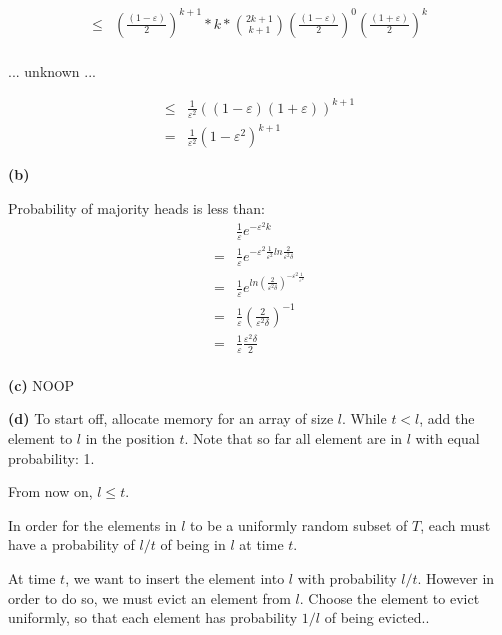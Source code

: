 \documentclass[11pt]{article}
\renewcommand{\part}[1] {\vspace{.10in} {\bf (#1)}}
\begin{document}
\begin{align*}
\leq & (\frac{(1-\varepsilon)}{2})^{k+1} * k * \binom{2k+1}{k+1} (\frac{(1-\varepsilon)}{2})^{0} (\frac{(1+\varepsilon)}{2})^{k}\\
\end{align*}

... unknown ...

\begin{align*}
\leq & \frac{1}{\varepsilon^2} ((1-\varepsilon)(1+\varepsilon))^{k+1}\\
= & \frac{1}{\varepsilon^2} (1-\varepsilon^2)^{k+1}
\end{align*}

\part{b}

Probability of majority heads is less than:
\begin{align*}
  & \frac{1}{\varepsilon} e^{-\varepsilon^2 k}\\
= & \frac{1}{\varepsilon} e^{-\varepsilon^2 \frac{1}{\varepsilon^2} ln \frac{2}{\varepsilon^2 \delta}}\\
= & \frac{1}{\varepsilon} e^{ln (\frac{2}{\varepsilon^2 \delta})^{-\varepsilon^2 \frac{1}{\varepsilon^2} }}\\
= & \frac{1}{\varepsilon} (\frac{2}{\varepsilon^2 \delta})^{-1}\\
= & \frac{1}{\varepsilon} \frac{\varepsilon^2 \delta}{2}\\
\end{align*}


\part{c}
NOOP


\part{d}
To start off, allocate memory for an array of size $l$.
While $t<l$, add the element to $l$ in the position $t$.
Note that so far all element are in $l$ with equal probability: 1.

From now on, $l \leq t$.

In order for the elements in $l$ to be a uniformly random subset of $T$,
each must have a probability of $l/t$ of being in $l$ at time $t$.

At time $t$, we want to insert the element into $l$ with probability $l/t$.
However in order to do so, we must evict an element from $l$.
Choose the element to evict uniformly, so that each element has probability $1/l$ of being evicted..
\end{document}
